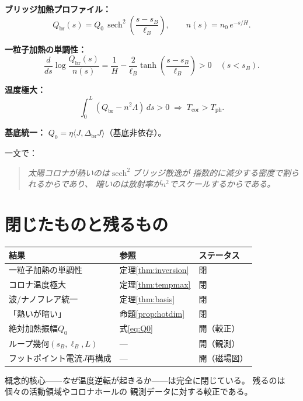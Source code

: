 \documentclass[12pt]{article}
\theoremstyle{plain}
\theoremstyle{definition}
\numberwithin{equation}{section}
\newcommand{\br}{\mathrm{br}}
\newcommand{\ph}{\mathrm{ph}}
\newcommand{\cor}{\mathrm{cor}}
\DeclareMathOperator{\sech}{sech}
\begin{document}
\textbf{ブリッジ加熱プロファイル：}
\begin{equation}
Q_{\br}(s) = Q_0\,\sech^2\!\left(\frac{s-s_B}{\ell_B}\right),
\qquad n(s) = n_0\,e^{-s/H}.
\end{equation}

\textbf{一粒子加熱の単調性：}
\begin{equation}
\frac{d}{ds}\log\frac{Q_{\br}(s)}{n(s)}
= \frac{1}{H}
- \frac{2}{\ell_B}\tanh\!\left(\frac{s-s_B}{\ell_B}\right)
> 0 \quad(s<s_B).
\end{equation}

\textbf{温度極大：}
\begin{equation}
\int_0^L(Q_{\br}-n^2\Lambda)\,ds > 0
\;\Longrightarrow\;
T_{\cor} > T_{\ph}.
\end{equation}

\textbf{基底統一：}
$Q_0 = \eta\langle J,\Delta_{\br}J\rangle$（基底非依存）。

一文で：

\begin{quote}
\emph{太陽コロナが熱いのは$\sech^2$ブリッジ散逸が
指数的に減少する密度で割られるからであり、
暗いのは放射率が$n^2$でスケールするからである。}
\end{quote}


\section{閉じたものと残るもの}\label{sec:status}

\begin{center}
\begin{tabular}{lll}
\toprule
結果 & 参照 & ステータス\\
\midrule
一粒子加熱の単調性 & 定理\ref{thm:inversion} & 閉\\
コロナ温度極大 & 定理\ref{thm:tempmax} & 閉\\
波/ナノフレア統一 & 定理\ref{thm:basis} & 閉\\
「熱いが暗い」 & 命題\ref{prop:hotdim} & 閉\\
\midrule
絶対加熱振幅$Q_0$ & 式\eqref{eq:Q0} & 開（較正）\\
ループ幾何$(s_B,\ell_B,L)$ & --- & 開（観測）\\
フットポイント電流$J$再構成 & --- & 開（磁場図）\\
\bottomrule
\end{tabular}
\end{center}

概念的核心——\emph{なぜ}温度逆転が起きるか——は完全に閉じている。
残るのは個々の活動領域やコロナホールの
観測データに対する較正である。
\end{document}
